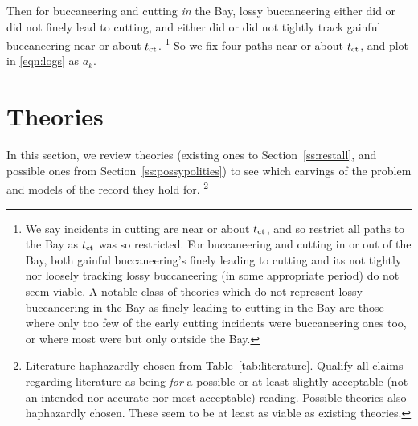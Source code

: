 		Then for buccaneering and cutting \emph{in} the Bay, lossy buccaneering either did or did not finely lead to cutting, and either did or did not tightly track gainful buccaneering near or about \(t_{\operatorname{ct}}\).%
		\footnote{We say  incidents in  cutting are near or about \(t_{\operatorname{ct}}\), and so restrict all paths to the Bay as \(t_{\operatorname{ct}}\) was so restricted. For buccaneering and cutting in or out of the Bay, both gainful buccaneering's finely leading to cutting and its not tightly nor loosely tracking lossy buccaneering (in some appropriate period) do not seem viable. A notable class of theories which do not represent lossy buccaneering in the Bay as finely leading to cutting in the Bay are those where only too few of the early cutting incidents were buccaneering ones too, or where most were but only outside the Bay.} %
		So we fix four paths near or about \(t_{\operatorname{ct}}\), and plot in \ref{eqn:logs} as \(a_k\). %
%
%
%
%
\section{Theories} %
\label{s:theories}
	In this section, we review theories (existing ones to Section~\ref{ss:restall}, and possible ones from Section~\ref{ss:possypolities}) to see which carvings of the problem and models of the record they hold for.%
	\footnote{Literature haphazardly chosen from Table~\ref{tab:literature}. Qualify all claims regarding literature as being \emph{for} a possible or at least slightly acceptable (not an intended nor accurate nor most acceptable) reading. Possible theories also haphazardly chosen. These seem to be at least as viable as existing theories.} %

